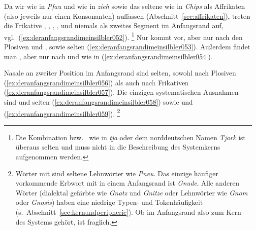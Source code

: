 Da wir \textipa{[\t{pf}]} wie in \textit{Pfau} und \textipa{[\t{ts}]} wie in \textit{zieh} sowie das seltene \textipa{[\t{tS}]} wie in \textit{Chips} als Affrikaten (also jeweils nur einen Konsonanten) auffassen (Abschnitt~\ref{sec:affrikaten}), treten die Frikative \textipa{[f]}, \textipa{[s]}, \textipa{[S]}, \textipa{[h]}, \textipa{[z]} und \textipa{[J]} niemals als zweites Segment im Anfangsrand auf, vgl.\ (\ref{ex:deranfangsrandimeinsilbler052}).%
\footnote{Die Kombination \textipa{[tJ]} bzw.\ \textipa{[t\c{c}]} wie in \textit{tja} oder dem norddeutschen Namen \textit{Tjark} ist überaus selten und muss nicht in die Beschreibung des Systemkerns aufgenommen werden.}
Nur \textipa{[K]} kommt vor, aber nur nach den Plosiven und \textipa{[f]}, \textipa{[S]} sowie selten \textipa{[v]} (\ref{ex:deranfangsrandimeinsilbler053}).
Außerdem findet man \textipa{[v]}, aber nur nach \textipa{[k]} und \textipa{[S]} wie in (\ref{ex:deranfangsrandimeinsilbler054}).

\begin{exe}
  \ex\label{ex:deranfangsrandimeinsilbler051}
  \begin{xlist}
  \end{xlist}
\end{exe}

Nasale an zweiter Position im Anfangsrand sind selten, sowohl nach Plosiven (\ref{ex:deranfangsrandimeinsilbler056}) als auch nach Frikativen (\ref{ex:deranfangsrandimeinsilbler057}).
Die einzigen systematischen Ausnahmen sind \textipa{[kn]} und selten \textipa{[gn]} (\ref{ex:deranfangsrandimeinsilbler058}) sowie \textipa{[Sn]} und \textipa{[Sm]} (\ref{ex:deranfangsrandimeinsilbler059}).%
\footnote{Wörter mit \textipa{[pn]} sind seltene Lehnwörter wie \textit{Pneu}.
Das einzige häufiger vorkommende Erbwort mit \textipa{[gn]} in einem Anfangsrand ist \textit{Gnade}.
Alle anderen Wörter (\zB dialektal gefärbte wie \textit{Gnatz} und \textit{Gnitze} oder Lehnwörter wie \textit{Gnom} oder \textit{Gnosis}) haben eine niedrige Typen- und Tokenhäufigkeit (s.\ Abschnitt~\ref{sec:kernundperipherie}).
Ob \textipa{[gn]} im Anfangsrand also zum Kern des Systems gehört, ist fraglich.}

\begin{exe}
  \ex\label{ex:deranfangsrandimeinsilbler055}
  \begin{xlist}
  \end{xlist}
\end{exe}

